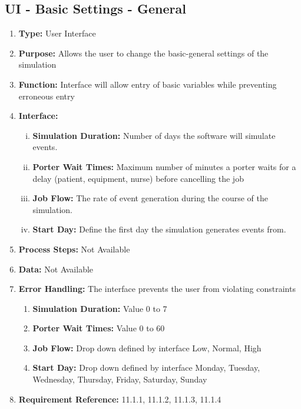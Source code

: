 \documentclass[paper=letter, fontsize=10pt]{scrartcl}
\numberwithin{equation}{section}		%
\numberwithin{figure}{section}			%
\numberwithin{table}{section}				%
\begin{document}
\subsection{UI - Basic Settings - General}
\begin{enumerate}[]
	\item \textbf{Type:} User Interface
	\item \textbf{Purpose:} Allows the user to change the basic-general settings of the simulation
	\item \textbf{Function:} Interface will allow entry of basic variables while preventing erroneous entry
	\item \textbf{Interface:} 
	\begin{enumerate}[(i)]
		\item \textbf{Simulation Duration:} Number of days the software will simulate events.
		\item \textbf{Porter Wait Times:} Maximum number of minutes a porter waits for a delay (patient, equipment, nurse) before cancelling the job
		\item \textbf{Job Flow:} The rate of event generation during the course of the simulation.
		\item \textbf{Start Day:} Define the first day the simulation generates events from.
	\end{enumerate}
	\item \textbf{Process Steps:} Not Available
	\item \textbf{Data:} Not Available
	\item \textbf{Error Handling:} The interface prevents the user from violating constraints
	\begin{enumerate}[]
		\item \textbf{Simulation Duration:} Value 0 to 7 
		\item \textbf{Porter Wait Times:} Value 0 to 60
		\item \textbf{Job Flow:} Drop down defined by interface {Low, Normal, High}
		\item \textbf{Start Day:} Drop down defined by interface {Monday, Tuesday, Wednesday, Thursday, Friday, Saturday, Sunday}   
	\end{enumerate}
	\item \textbf{Requirement Reference:} 11.1.1, 11.1.2, 11.1.3, 11.1.4
\end{enumerate}
\end{document}
